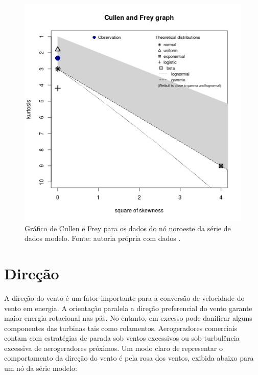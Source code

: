 \documentclass[
	12pt,				%
	openright,			%
	oneside,			%
	a4paper,			%
	english,			%
	french,				%
	spanish,			%
	brazil				%
	]{abntex2}
\begin{document}
\begin{figure}[h]
    \centering
	\includegraphics[scale=0.6]{cullen}
	\caption{Gráfico de Cullen e Frey para os dados do nó noroeste da série de dados modelo. Fonte: autoria própria com dados \cite{era5}.}
	\label{fig:cullen}
\end{figure}
\FloatBarrier

\section{Direção}

A direção do vento é um fator importante para a conversão de velocidade do vento em energia. A orientação paralela a direção preferencial do vento garante maior energia rotacional nas pás. No entanto, em excesso pode danificar alguns componentes das turbinas tais como rolamentos. Aerogeradores comerciais contam com estratégias de parada sob ventos excessivos ou sob turbulência excessiva de aerogeradores próximos.
Um modo claro de representar o comportamento da direção do vento é pela rosa dos ventos, exibida abaixo para um nó da série modelo:
\end{document}
